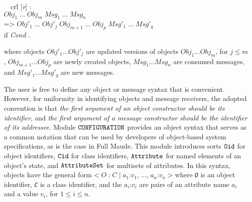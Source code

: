 {\small \ttfamily
\begin{tabbing}
\     \ cr\=l [\textit{r}] :\\
      \> \(\textit{Obj}_1\;\ldots\;\textit{Obj}_m\;\textit{Msg}_1\;\ldots\;\textit{Msg}_n\) \\
      \> => \= \(\textit{Obj}'_1\;\ldots\;\textit{Obj}'_j\;\textit{Obj}_{m+1}\;\ldots\;\textit{Obj}_p\;\textit{Msg}'_1\;\ldots\;\textit{Msg}'_q\) \\
      \> if \textit{Cond} .
\end{tabbing}
\rmfamily }


\noindent where objects \texttt{\(\textit{Obj}'_1 \ldots \textit{Obj}'_j\)} are updated versions of objects
\texttt{\(\textit{Obj}_1 \ldots \textit{Obj}_m\)}, for $j \leq m$, 
\texttt{\(\textit{Obj}_{m+1} \ldots \textit{Obj}_p\)} are newly created objects,
\texttt{\(\textit{Msg}_1 \ldots \textit{Msg}_n\)} are consumed messages, 
and \texttt{\(\textit{Msg}'_1 \ldots \textit{Msg}'_q\)} are new messages.

The user is free to define any object or message syntax that is convenient.
However, for uniformity in identifying objects and message receivers,
the adopted convention is that {\em the first argument of an object constructor should be its identifier}, and {\em the first argument of a
message constructor should be the identifier of its addressee}. Module $\text{\tt CONFIGURATION}$
provides an object syntax that serves as a common notation that can be used by
developers of object-based system specifications, as is the case
in Full Maude. This module introduces sorts $\text{\tt Oid}$ for
object identifiers, $\text{\tt Cid}$ for class identifiers,
$\text{\tt Attribute}$ for named elements of an object's state,
and $\text{\tt AttributeSet}$ for multisets of attributes. 
In this syntax, objects have the general form
\texttt{\(\texttt{<} \; \textit{O} \; \texttt{:} \; \textit{C} \; \texttt{|} \; \textit{a}_1 \texttt{:} \textit{v}_1
\texttt{,} \; ... \texttt{,} \; \textit{a}_n \texttt{:} \textit{v}_n \; \texttt{>}\)}
where \texttt{\textit{O}} is an object identifier, \texttt{\textit{C}} is a class identifier, and 
the \texttt{\(\textit{a}_i \texttt{:} \textit{v}_i\)} are 
pairs of an attribute name $\textit{a}_i$ and a value $\textit{v}_i$, for $1\leq i\leq n$. 


